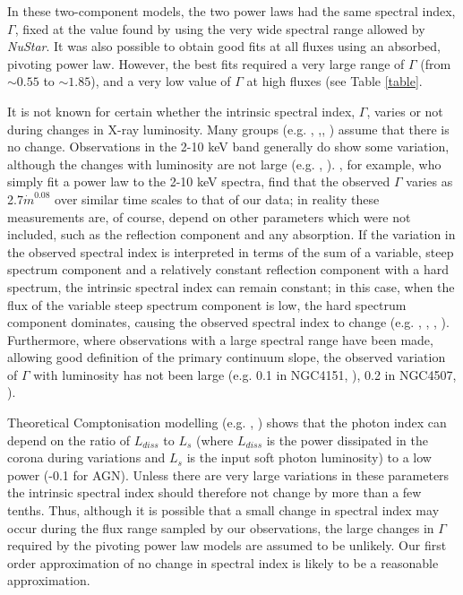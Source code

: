 \documentclass[useAMS,usenatbib]{sam}
\begin{document}
In these two-component models, the two power laws had the same spectral index, $\Gamma$, fixed at the value found by \citet{risaliti13} using the very wide spectral
range allowed by {\it NuStar}. It was also possible to obtain good fits at all fluxes using an absorbed, pivoting power law. However, the best fits required a very large
range of $\Gamma$ (from $\sim 0.55$ to $\sim 1.85$), and a very low value of $\Gamma$ at high fluxes (see Table \ref{table}.

It is not known for certain whether the intrinsic spectral index, $\Gamma$, varies or not during changes in X-ray luminosity. Many groups (e.g. \citet{miller08},
\citet{turner07},\citet{fabian05}, \citet{pounds04}) assume that there is no change. Observations in the 2-10 keV band generally do show some variation, although the
changes with luminosity are not large (e.g. \citet{sobolewska}, \citet{zdziarski99}). \citet{sobolewska}, for example, who simply fit a power law to the 2-10 keV spectra,
find that the observed $\Gamma$ varies as 2.7$\dot m ^{0.08}$ over similar time scales to that of our data; in reality these measurements are, of course, depend on other
parameters which were not included, such as the reflection component and any absorption. If the variation in the observed spectral index is interpreted in terms of the
sum of a variable, steep spectrum component and a relatively constant reflection component with a hard spectrum, the intrinsic spectral index can remain constant; in this
case, when the flux of the variable steep spectrum component is low, the hard spectrum component dominates, causing the observed spectral index to change (e.g.
\citet{guainazzi99}, \citet{uttley99}, \citet{ponti}, \citet{fabian03}). Furthermore, where observations with a large spectral range have been made, allowing good
definition of the primary continuum slope, the observed variation of $\Gamma$ with luminosity has not been large (e.g. 0.1 in NGC4151, \citet{lubinski10}), 0.2 in
NGC4507, \citet{braito}).

Theoretical Comptonisation modelling (e.g. \citet{beloborodov99}, \citet{coppi92}) shows that the photon index can depend on the ratio of $L_{diss}$ to $L_s$ (where
$L_{diss}$ is the power dissipated in the corona during variations and $L_s$ is the input soft photon luminosity) to a low power (-0.1 for AGN). Unless there are very
large variations in these parameters the intrinsic spectral index should therefore not change by more than a few tenths. Thus, although it is possible that a small change
in spectral index may occur during the flux range sampled by our observations, the large changes in $\Gamma$ required by the pivoting power law models are assumed to
be unlikely. Our first order approximation of no change in spectral index is likely to be a reasonable approximation. 
\end{document}
